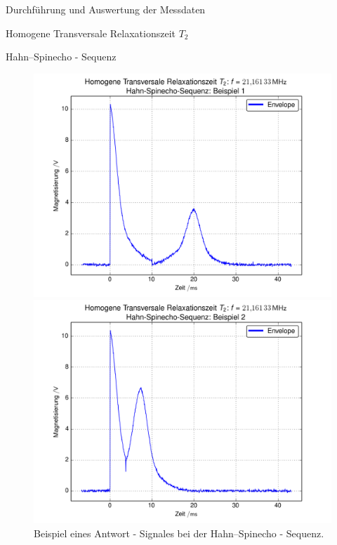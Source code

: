 \documentclass[pdftex, a4paper,11pt, twoside, ngerman]{report}
\begin{document}
\begin{chapter}{Durchführung und Auswertung der Messdaten}
\begin{section}{
        Homogene Transversale Relaxationszeit $T_{2}$}
\begin{subsection}{Hahn--Spinecho - Sequenz}
\begin{figure}[htb]
\begin{minipage}{.48\textwidth}
            \includegraphics[width=\textwidth]
            {Figures/HomoTransRelax_Hahn_beispiel0.png}
            \caption{Beispiel eines Antwort - Signales bei der
              Hahn--Spinecho - Sequenz.}
            \label{figHahnBsp1}
          \end{minipage}\quad
          \begin{minipage}{.48\textwidth}
            \centering
            \includegraphics[width=\textwidth]
            {Figures/HomoTransRelax_Hahn_beispiel1.png}
            \caption{Beispiel eines Antwort - Signales bei der
              Hahn--Spinecho - Sequenz.}
            \label{figHahnBsp2}
          \end{minipage}
        \end{figure}
        

\end{subsection}
\end{section}
\end{chapter}
\end{document}
